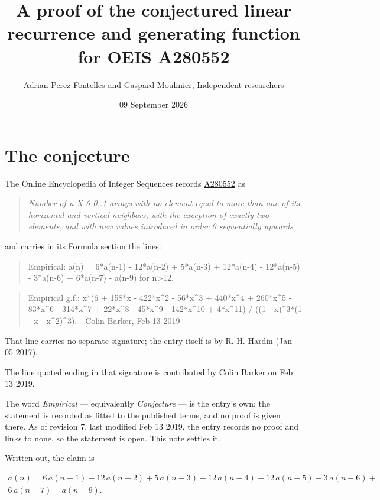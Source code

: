 \documentclass[11pt]{article}
\title{A proof of the conjectured linear recurrence and generating function for OEIS A280552}
\author{Adrian Perez Fontelles and Gaspard Moulinier, Independent researchers}
\date{09 September 2026}
\theoremstyle{definition}
\begin{document}
\maketitle
\section{The conjecture}

The Online Encyclopedia of Integer Sequences records \href{https://oeis.org/A280552}{A280552} as

\begin{quote}\itshape Number of n X 6 0..1 arrays with no element equal to more than one of its horizontal and vertical neighbors, with the exception of exactly two elements, and with new values introduced in order 0 sequentially upwards\end{quote}

and carries in its Formula section the lines:

\begin{quote}\ttfamily Empirical: a(n) = 6*a(n-1) - 12*a(n-2) + 5*a(n-3) + 12*a(n-4) - 12*a(n-5) - 3*a(n-6) + 6*a(n-7) - a(n-9) for n>12.\end{quote}

\begin{quote}\ttfamily Empirical g.f.: x*(6 + 158*x - 422*x\textasciicircum{}2 - 56*x\textasciicircum{}3 + 440*x\textasciicircum{}4 + 260*x\textasciicircum{}5 - 83*x\textasciicircum{}6 - 314*x\textasciicircum{}7 + 22*x\textasciicircum{}8 - 45*x\textasciicircum{}9 - 142*x\textasciicircum{}10 + 4*x\textasciicircum{}11) / ((1 - x)\textasciicircum{}3*(1 - x - x\textasciicircum{}2)\textasciicircum{}3). - Colin Barker, Feb 13 2019\end{quote}

That line carries no separate signature; the entry itself is by R. H. Hardin (Jan 05 2017).

The line quoted ending in that signature is contributed by Colin Barker on Feb 13 2019.

The word {\itshape Empirical} --- equivalently {\itshape Conjecture} --- is the entry's own: the statement is recorded as fitted to the published terms, and no proof is given there. As of revision 7, last modified Feb 13 2019, the entry records no proof and links to none, so the statement is open. This note settles it.

Written out, the claim is

\begin{multline*} a(n) = 6\,a(n-1) - 12\,a(n-2) + 5\,a(n-3) + 12\,a(n-4) - 12\,a(n-5) - 3\,a(n-6) + \\ 6\,a(n-7) - a(n-9). \end{multline*}
\end{document}
